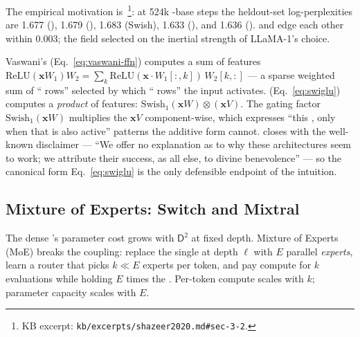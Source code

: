 The empirical motivation is~\citet[\S 3.2,
Tab.~1]{shazeer2020}\footnote{KB excerpt:
\nolinkurl{kb/excerpts/shazeer2020.md#sec-3-2}.}: at 524k -base steps
the heldout-set log-perplexities are 1.677 (), 1.679 (), 1.683
(Swish), 1.633 (), and 1.636 ().  and  edge each
other within $0.003$; the field selected  on the inertial
strength of LLaMA-1's choice.

\begin{intuition}
Vaswani's  (Eq.~\eqref{eq:vaswani-ffn}) computes a sum of features
$\mathrm{ReLU}(\mathbf{x} W_1) W_2 = \sum_k \mathrm{ReLU}(\mathbf{x}\!\cdot\!W_1[:,k])\,W_2[k,:]$
--- a sparse weighted sum of `` rows'' selected by which
`` rows'' the input activates. 
(Eq.~\eqref{eq:swiglu}) computes a \emph{product} of features:
$\mathrm{Swish}_1(\mathbf{x} W) \otimes (\mathbf{x} V)$. The gating
factor $\mathrm{Swish}_1(\mathbf{x} W)$ multiplies the 
$\mathbf{x} V$ component-wise, which expresses ``this , only
when that  is also active'' patterns the additive form cannot.
\citet[\S 4]{shazeer2020} closes with the well-known disclaimer ---
``We offer no explanation as to why these architectures seem to
work; we attribute their success, as all else, to divine benevolence''
--- so the canonical form Eq.~\eqref{eq:swiglu} is the only defensible
endpoint of the intuition.
\end{intuition}

\subsection{Mixture of Experts: Switch and Mixtral}
\label{sec:ffn-moe-coarse}

The dense 's parameter cost grows with $\mathsf{D}^2$ at fixed
depth. Mixture of Experts (MoE) breaks the coupling: replace the
single  at depth $\ell$ with $E$ parallel 
\emph{experts}, learn a router that picks $k \ll E$ experts per
token, and pay compute for $k$  evaluations while holding $E$
times the . Per-token compute scales with $k$;
parameter capacity scales with $E$.

